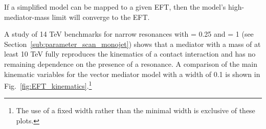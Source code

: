 If a simplified model can be mapped to a given EFT, then the model's high-mediator-mass limit  will converge to the EFT.

A study of 14 TeV benchmarks for narrow resonances with \gq = 0.25 and \gDM = 1 (see Section~\ref{sub:parameter_scan_monojet})
shows that a mediator with a mass of at least 10 TeV fully reproduces the kinematics of a contact
interaction and has no remaining dependence on the presence of a resonance. 
A comparison of the main kinematic variables for the \schannel vector 
mediator model with a width of 0.1 \mMed
is shown in Fig.~\ref{fig:EFT_kinematics}.\footnote{The use of a fixed width rather than the minimal width is exclusive of these plots.} 


